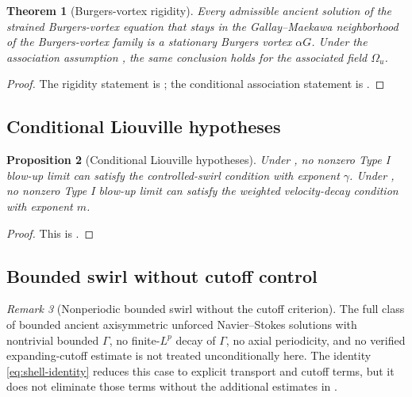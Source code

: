 \documentclass[11pt]{amsart}
\theoremstyle{plain}
\newtheorem{theorem}{Theorem}[section]
\newtheorem{proposition}[theorem]{Proposition}
\theoremstyle{definition}
\theoremstyle{remark}
\newtheorem{remark}[theorem]{Remark}
\numberwithin{equation}{section}
\begin{document}
\begin{theorem}[Burgers-vortex rigidity]
\label{thm:burgers-vortex-summary}
Every admissible ancient solution of the strained Burgers-vortex equation that
stays in the Gallay--Maekawa neighborhood of the Burgers-vortex family is a
stationary Burgers vortex \(\alpha G\).  Under the association assumption
, the same conclusion holds for the associated field
\(\Omega_u\).
\end{theorem}

\begin{proof}
The rigidity statement is ; the
conditional association statement is .
\end{proof}

\subsection{Conditional Liouville hypotheses}

\begin{proposition}[Conditional Liouville hypotheses]
\label{prop:conditional-liouville}
Under , no nonzero Type I blow-up limit
can satisfy the controlled-swirl condition with exponent \(\gamma\).  Under
, no nonzero Type I blow-up limit can
satisfy the weighted velocity-decay condition with exponent \(m\).
\end{proposition}

\begin{proof}
This is .
\end{proof}

\subsection{Bounded swirl without cutoff control}

\begin{remark}[Nonperiodic bounded swirl without the cutoff criterion]
The full class of bounded ancient axisymmetric unforced Navier--Stokes
solutions with nontrivial bounded \(\Gamma\), no finite-\(L^p\) decay of
\(\Gamma\), no axial periodicity, and no verified expanding-cutoff estimate is
not treated unconditionally here.  The identity \eqref{eq:shell-identity}
reduces this case to explicit transport and cutoff terms, but it does not
eliminate those terms without the additional estimates in
.
\end{remark}
\end{document}
